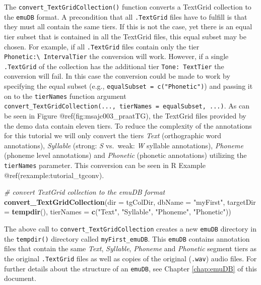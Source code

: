 \documentclass[]{book}
\newenvironment{Shaded}{\begin{snugshade}}{\end{snugshade}}
\newcommand{\KeywordTok}[1]{\textcolor[rgb]{0.13,0.29,0.53}{\textbf{{#1}}}}
\newcommand{\DataTypeTok}[1]{\textcolor[rgb]{0.13,0.29,0.53}{{#1}}}
\newcommand{\StringTok}[1]{\textcolor[rgb]{0.31,0.60,0.02}{{#1}}}
\newcommand{\CommentTok}[1]{\textcolor[rgb]{0.56,0.35,0.01}{\textit{{#1}}}}
\newcommand{\NormalTok}[1]{{#1}}
\theoremstyle{definition}
\theoremstyle{definition}
\theoremstyle{definition}
\theoremstyle{remark}
\begin{document}
The \texttt{convert\_TextGridCollection()} function converts a TextGrid
collection to the \texttt{emuDB} format. A precondition that all
\texttt{.TextGrid} files have to fulfill is that they must all contain
the same tiers. If this is not the case, yet there is an equal tier
subset that is contained in all the TextGrid files, this equal subset
may be chosen. For example, if all \texttt{.TextGrid} files contain only
the tier \texttt{Phonetic:\textbackslash{}\ IntervalTier} the conversion
will work. However, if a single \texttt{.TextGrid} of the collection has
the additional tier \texttt{Tone:\ TextTier} the conversion will fail.
In this case the conversion could be made to work by specifying the
equal subset (e.g., \texttt{equalSubset\ =\ c("Phonetic")}) and passing
it on to the \texttt{tierNames} function argument
\texttt{convert\_TextGridCollection(...,\ tierNames\ =\ equalSubset,\ ...)}.
As can be seen in Figure @ref(fig:msajc003\_praatTG), the TextGrid files
provided by the demo data contain eleven tiers. To reduce the complexity
of the annotations for this tutorial we will only convert the tiers
\emph{Text} (orthographic word annotations), \emph{Syllable} (strong:
\emph{S} vs.~weak: \emph{W} syllable annotations), \emph{Phoneme}
(phoneme level annotations) and \emph{Phonetic} (phonetic annotations)
utilizing the \texttt{tierNames} parameter. This conversion can be seen
in R Example @ref(rexample:tutorial\_tgconv).

\begin{Shaded}
\begin{Highlighting}[]
\CommentTok{# convert TextGrid collection to the emuDB format}
\KeywordTok{convert_TextGridCollection}\NormalTok{(}\DataTypeTok{dir =} \NormalTok{tgColDir,}
                           \DataTypeTok{dbName =} \StringTok{"myFirst"}\NormalTok{,}
                           \DataTypeTok{targetDir =} \KeywordTok{tempdir}\NormalTok{(),}
                           \DataTypeTok{tierNames =} \KeywordTok{c}\NormalTok{(}\StringTok{"Text"}\NormalTok{, }\StringTok{"Syllable"}\NormalTok{,}
                                         \StringTok{"Phoneme"}\NormalTok{, }\StringTok{"Phonetic"}\NormalTok{))}
\end{Highlighting}
\end{Shaded}

The above call to \texttt{convert\_TextGridCollection} creates a new
\texttt{emuDB} directory in the \texttt{tempdir()} directory called
\texttt{myFirst\_emuDB}. This \texttt{emuDB} contains annotation files
that contain the same \emph{Text}, \emph{Syllable}, \emph{Phoneme} and
\emph{Phonetic} segment tiers as the original \texttt{.TextGrid} files
as well as copies of the original (\texttt{.wav}) audio files. For
further details about the structure of an \texttt{emuDB}, see Chapter
\ref{chap:emuDB} of this document.
\end{document}
